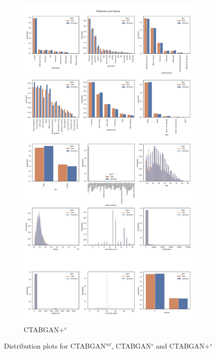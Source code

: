\begin{landscape}
\begin{figure}[h]
\begin{subfigure}{0.3\linewidth}
			\includegraphics[height=\textheight,width=\linewidth,keepaspectratio]{images/distributions_full/ctabgan+_simTune.jpg}
			\caption{CTABGAN+$^s$}
		\end{subfigure}	
		\hfill
		\caption[Distribution plots CTABGAN Models]{Distribution plots for CTABGAN$^{ml}$, CTABGAN$^s$ and CTABGAN+$^s$}
		\label{fig_a:dist_1}
	\end{figure}
\end{landscape}
